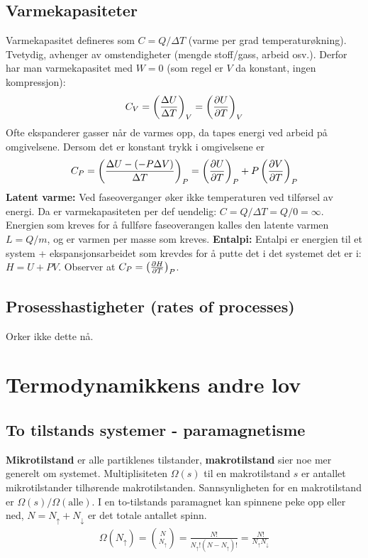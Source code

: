 \documentclass[12pt]{article}
\begin{document}
\subsection{Varmekapasiteter}
Varmekapasitet defineres som $C = Q/\Delta{T}$ (varme per grad temperaturøkning). Tvetydig,
avhenger av omstendigheter (mengde stoff/gass, arbeid osv.). Derfor har man
varmekapasitet med $W = 0$ (som regel er $V$ da konstant, ingen kompressjon):
\begin{align*}
  C_V = \left( \frac{\Delta U}{\Delta T} \right)_V = \left( \pdv{U}{T}\right)_V
\end{align*}
Ofte ekspanderer gasser når de varmes opp, da tapes energi ved arbeid på omgivelsene.
Dersom det er konstant trykk i omgivelsene er
\begin{align*}
  C_P = \left( \frac{\Delta U - (-P\Delta V)}{\Delta T} \right)_P =  \left( \pdv{U}{T}\right)_P + P\left( \pdv{V}{T}\right)_P
\end{align*} \newline \noindent
\textbf{Latent varme:} Ved faseoverganger øker ikke temperaturen ved tilførsel av energi. Da
er varmekapasiteten per def uendelig: $C = Q/\Delta{T} = Q/0 = \infty$. Energien som kreves
for å fullføre faseoverangen kalles den latente varmen $L = Q/m$, og er varmen per
masse som kreves.\newline \noindent
\textbf{Entalpi:} Entalpi er energien til et system + ekspansjonsarbeidet som
krevdes for å putte det i det systemet det er i: $H = U + PV$. Observer at
$C_P = \left( \pdv{H}{T} \right)_P$.
\subsection{Prosesshastigheter (rates of processes)}
Orker ikke dette nå.
\section{Termodynamikkens andre lov}
\subsection{To tilstands systemer - paramagnetisme}
\textbf{Mikrotilstand} er alle partiklenes tilstander, \textbf{makrotilstand} sier
noe mer generelt om systemet. Multiplisiteten $\Omega(s)$ til en makrotilstand $s$ er antallet mikrotilstander
tilhørende makrotilstanden. Sannsynligheten for en makrotilstand er $\Omega(s)/\Omega(\text{alle})$. I en
to-tilstands paramagnet kan spinnene peke opp eller ned, $N = N_\uparrow + N_\downarrow$ er det totale antallet
spinn.
\begin{align*}
  \Omega(N_\uparrow) = \binom{N}{N_\uparrow} = \frac{N!}{N_\uparrow! (N - N_\uparrow)!} = \frac{N!}{N_\uparrow N_\downarrow}
\end{align*}
\end{document}
